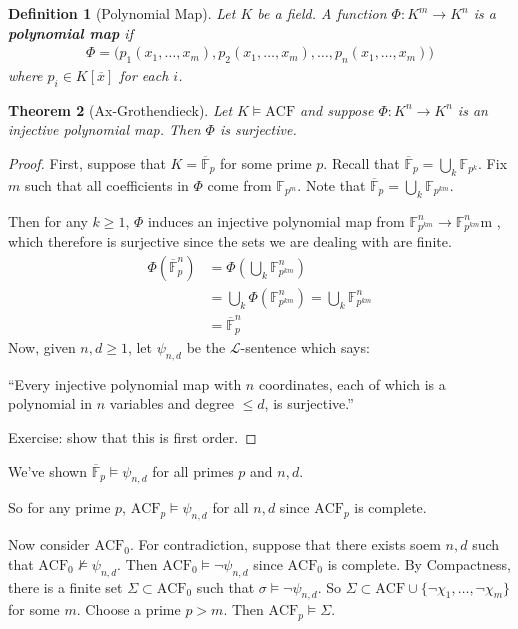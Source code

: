 \documentclass[]{article}
\theoremstyle{custhm}
\newtheorem{theorem}{Theorem}[section]
\theoremstyle{cusdef}
\newtheorem{defin}[theorem]{Definition}
\theoremstyle{custhm}
\theoremstyle{custhm}
\theoremstyle{custhm}
\theoremstyle{ex}
\theoremstyle{custhm}
\theoremstyle{cusdef}
\theoremstyle{remark}
\newcommand{\ra}{\rightarrow}
\newcommand{\undf}[1]{\textit{\textbf{#1}}}
\renewcommand{\L}{\mathcal{L}}
\renewcommand{\bar}{\overline}
\newcommand{\acf}{\textrm{ACF}}
\newcommand{\F}{\mathbb{F}}
\begin{document}
\begin{defin}[Polynomial Map]
Let $K$ be a field. A function $\Phi: K^m\ra K^n$ is a \undf{polynomial map} if
\begin{align*}
\Phi = \big(p_1(x_1,\dots,x_m),p_2(x_1,\dots,x_m),\dots,p_n(x_1,\dots,x_m)\big)
\end{align*}
where $p_i \in K[\bar{x}]$ for each $i$.
\end{defin}
\begin{theorem}[Ax-Grothendieck]
Let $K\models \acf$ and suppose $\Phi:K^n\ra K^n$ is an injective polynomial map. Then $\Phi$ is surjective.
\end{theorem}
\begin{proof}
First, suppose that $K = \bar{\mathbb{F}}_p$ for some prime $p$. Recall that $\bar{\mathbb{F}}_p = \bigcup_k \mathbb{F}_{p^k}$. Fix $m$ such that all coefficients in $\Phi$ come from $\mathbb{F}_{p^m}$. Note that $\bar{\mathbb{F}}_p = \bigcup_k \mathbb{F}_{p^{km}}$.

Then for any $k\ge 1$, $\Phi$ induces an injective polynomial map from $\mathbb{F}_{p^{km}}^n \ra \mathbb{F}_{p^{km}}^n$m , which therefore is surjective since the sets we are dealing with are finite.
\begin{align*}
\Phi\left(\bar{\mathbb{F}}_p^n\right) &= \Phi\left(\bigcup_k\mathbb{F}_{p^{km}}^n\right)\\
&= \bigcup_k\Phi\left(\mathbb{F}_{p^{km}}^n\right) = \bigcup_k\mathbb{F}_{p^{km}}^n\\
&=\bar{\mathbb{F}}_p^n
\end{align*}
Now, given $n,d\ge 1$, let $\psi_{n,d}$ be the $\L$-sentence which says:

``Every injective polynomial map with $n$ coordinates, each of which is a polynomial in $n$ variables and degree $\le d$, is surjective.''

Exercise: show that this is first order.
\end{proof}

We've shown $\bar{\F}_p \models \psi_{n,d}$ for all primes $p$ and $n,d$.

So for any prime $p$, $\acf_p\models\psi_{n,d}$ for all $n,d$ since $\acf_p$ is complete.

Now consider $\acf_0$. For contradiction, suppose that there exists soem $n,d$ such that $\acf_0\not\models\psi_{n,d}$. Then $\acf_0\models\neg\psi_{n,d}$ since $\acf_0$ is complete. By Compactness, there is a finite set $\Sigma\subset \acf_0$ such that $\sigma \models \neg \psi_{n,d}$. So $\Sigma\subset \acf\cup\{\neg\chi_1,\dots,\neg\chi_m\}$ for some $m$. Choose a prime $p > m$. Then $\acf_p\models \Sigma$.
\end{document}
